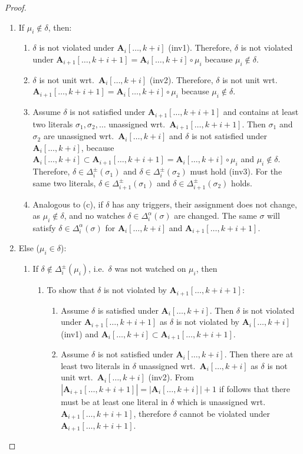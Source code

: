 \documentclass{vutinfth} %
\theoremstyle{example}
\theoremstyle{definition}
\theoremstyle{theorem}
\theoremstyle{lemma}
\theoremstyle{corollary}
\newcommand{\ass}{\mathbf{A}}
\newcommand{\abef}{\ass_{i}[\ldots, k + i]}
\newcommand{\aaf}{\ass_{i + 1}[\ldots, k + i + 1]}
\newcommand{\dbef}{\Delta_{i}}
\newcommand{\daf}{\Delta_{i+1}}
\newcommand{\sgl}{\mu}
\newcommand{\bsgl}{\sigma}
\begin{document}
\begin{proof}
\begin{enumerate}
\item If $\sgl_i \not \in \delta$, then: %
\begin{enumerate}
\item $\delta$ is not violated under $\abef$ (inv1). Therefore, $\delta$ is not violated under $\aaf = \abef \circ \sgl_i$ because $\sgl_i \not \in \delta$.
\item $\delta$ is not unit wrt.~$\abef$ (inv2). Therefore, $\delta$ is not unit wrt.~$\aaf = \abef \circ \sgl_i$ because $\sgl_i \not \in \delta$.
\item Assume $\delta$ is not satisfied under $\aaf$ and contains at least two literals $\bsgl_1, \bsgl_2, \ldots$ unassigned wrt.~$\aaf$. Then $\bsgl_1$ and $\bsgl_2$ are unassigned wrt.~$\abef$ and $\delta$ is not satisfied under $\abef$, because $\abef \subset \aaf = \abef \circ \sgl_i$ and $\sgl_i \not \in \delta$. Therefore, $\delta \in \dbef^\pm(\bsgl_1)$ and $\delta \in \dbef^\pm(\bsgl_2)$ must hold (inv3). For the same two literals, $\delta \in \daf^\pm(\bsgl_1)$ and $\delta \in \daf^\pm(\bsgl_2)$ holds. %
\item Analogous to (c), if $\delta$ has any triggers, their assignment does not change, as $\sgl_i \not \in \delta$, and no watches $\delta \in \dbef^\alpha(\bsgl)$ are changed. The same $\bsgl$ will satisfy $\delta \in \dbef^\alpha(\bsgl)$ for $\abef$ and $\aaf$.
\end{enumerate}
\item Else ($\sgl_i \in \delta$):
\begin{enumerate}
\item If $\delta \not \in \dbef^\pm(\sgl_i)$, i.e.~$\delta$ was not watched on $\sgl_i$, then
\begin{enumerate}
\item To show that $\delta$ is not violated by $\aaf$:
\begin{enumerate}
\item Assume $\delta$ is satisfied under $\abef$. Then $\delta$ is not violated under $\aaf$ as $\delta$ is not violated by $\abef$ (inv1) and $\abef \subset \aaf$.
\item Assume $\delta$ is not satisfied under $\abef$. Then there are at least two literals in $\delta$ unassigned wrt.~$\abef$ as $\delta$ is not unit wrt.~$\abef$ (inv2). From $|\aaf| = |\abef| + 1$ if follows that there must be at least one literal in $\delta$ which is unassigned wrt.~$\aaf$, therefore $\delta$ cannot be violated under $\aaf$.

\end{enumerate}
\end{enumerate}
\end{enumerate}
\end{enumerate}
\end{proof}
\end{document}
